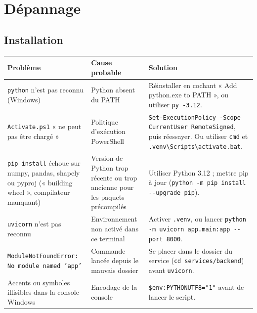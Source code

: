 \documentclass[11pt,a4paper]{article}
\begin{document}
\section{Dépannage}\label{sec:depannage}

\subsection{Installation}
\begin{center}
\small
\begin{longtable}{L{4.6cm}L{4cm}L{6.4cm}}
\toprule
\textbf{Problème} & \textbf{Cause probable} & \textbf{Solution} \\
\midrule
\endhead
\texttt{python} n'est pas reconnu (Windows) & Python absent du PATH & Réinstaller en cochant « Add python.exe to PATH », ou utiliser \texttt{py -3.12}. \\
\texttt{Activate.ps1} « ne peut pas être chargé » & Politique d'exécution PowerShell & \texttt{Set-ExecutionPolicy -Scope CurrentUser RemoteSigned}, puis réessayer. Ou utiliser \texttt{cmd} et \texttt{.venv\textbackslash Scripts\textbackslash activate.bat}. \\
\texttt{pip install} échoue sur numpy, pandas, shapely ou pyproj (« building wheel », compilateur manquant) & Version de Python trop récente ou trop ancienne pour les paquets précompilés & Utiliser Python 3.12 ; mettre pip à jour (\texttt{python -m pip install -{}-upgrade pip}). \\
\texttt{uvicorn} n'est pas reconnu & Environnement non activé dans ce terminal & Activer \texttt{.venv}, ou lancer \texttt{python -m uvicorn app.main:app -{}-port 8000}. \\
\texttt{ModuleNotFoundError: No module named 'app'} & Commande lancée depuis le mauvais dossier & Se placer dans le dossier du service (\texttt{cd services/backend}) avant \texttt{uvicorn}. \\
Accents ou symboles illisibles dans la console Windows & Encodage de la console & \texttt{\$env:PYTHONUTF8="1"} avant de lancer le script. \\
\bottomrule
\end{longtable}
\end{center}
\end{document}
